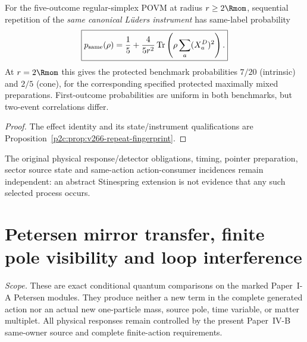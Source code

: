 \documentclass[12pt,a4paper]{article}
\begin{document}
\begin{corollary}
\label{p4b:cor:v266-quadratic-repeat}
For the five-outcome regular-simplex POVM at radius $r\ge2\Rmom$,
sequential repetition of the \emph{same canonical L\"uders instrument}
has same-label probability
\[
\boxed{p_{\rm same}(\rho)=\frac15+
\frac{4}{5r^2}\operatorname{Tr}\left(\rho\sum_a(X_a^D)^2\right).}
\]
At $r=2\Rmom$ this gives the protected benchmark probabilities
$7/20$ (intrinsic) and $2/5$ (cone), for the corresponding specified
protected maximally mixed preparations. First-outcome probabilities
are uniform in both benchmarks, but two-event correlations differ.
\end{corollary}
\begin{proof}
The effect identity and its state/instrument qualifications are
Proposition~\ref{p2c:prop:v266-repeat-fingerprint}.
\end{proof}
The original physical response/detector obligations, timing, pointer
preparation, sector source state and same-action action-consumer
incidences remain independent: an abstract Stinespring extension is
not evidence that any such selected process occurs.


\section{Petersen mirror transfer, finite pole visibility and loop interference}
\label{p4b:sec:v320-petersen-response}
\noindent\textit{Scope.} These are exact conditional quantum comparisons on
the marked Paper~I-A Petersen modules. They produce neither a new term
in the complete generated action nor an actual new one-particle mass,
source pole, time variable, or matter multiplet. All physical responses
remain controlled by the present Paper~IV-B same-owner source and
complete finite-action requirements.
\end{document}
